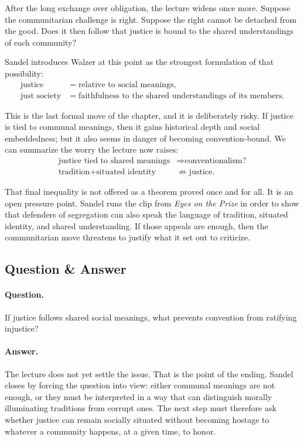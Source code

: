 After the long exchange over obligation, the lecture widens once more. Suppose the communitarian challenge is right. Suppose the right cannot be detached from the good. Does it then follow that justice is bound to the shared understandings of each community?

Sandel introduces Walzer at this point as the strongest formulation of that possibility:
\begin{align}
\text{justice} &= \text{relative to social meanings}, \\
\text{just society} &= \text{faithfulness to the shared understandings of its members}.
\end{align}

This is the last formal move of the chapter, and it is deliberately risky. If justice is tied to communal meanings, then it gains historical depth and social embeddedness; but it also seems in danger of becoming convention-bound. We can summarize the worry the lecture now raises:
\begin{align}
\text{justice tied to shared meanings} &\Longrightarrow \text{conventionalism?} \\
\text{tradition} + \text{situated identity} &\not\Longrightarrow \text{justice}.
\end{align}

That final inequality is not offered as a theorem proved once and for all. It is an open pressure point. Sandel runs the clip from \emph{Eyes on the Prize} in order to show that defenders of segregation can also speak the language of tradition, situated identity, and shared understanding. If those appeals are enough, then the communitarian move threatens to justify what it set out to criticize.

\subsection{Question \& Answer}

\paragraph{Question.} If justice follows shared social meanings, what prevents convention from ratifying injustice?

\paragraph{Answer.} The lecture does not yet settle the issue. That is the point of the ending. Sandel closes by forcing the question into view: either communal meanings are not enough, or they must be interpreted in a way that can distinguish morally illuminating traditions from corrupt ones. The next step must therefore ask whether justice can remain socially situated without becoming hostage to whatever a community happens, at a given time, to honor.

